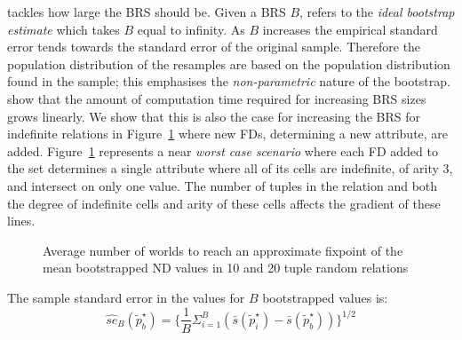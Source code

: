 \cite{et93} tackles how large the BRS should be. Given a BRS $B$, \cite{et93}
refers to the {\em ideal bootstrap estimate} which takes $B$ equal to
infinity. As $B$ increases the empirical standard error tends towards
the standard error of the original sample. Therefore the population
distribution of
the resamples are based on the population distribution found in the
sample; this emphasises the {\em non-parametric} nature of the bootstrap.
\cite{et93} show that the amount of computation time required for increasing
BRS sizes grows linearly. We show that this is also the case for 
increasing the BRS for indefinite relations in Figure~\ref{graph:linboot}
where new FDs, determining a new attribute, are added.
Figure~\ref{graph:linboot} represents a near {\em worst case scenario}
where each FD added to the 
set determines a single attribute where all of its cells are indefinite, of
arity 3, and intersect on only one value. The number of tuples in the
relation and both the degree of indefinite cells and arity of these
cells affects the gradient of these lines.


\begin{figure}
\centerline{}
\caption{\label{graph:linboot} {Average number of worlds to
reach an approximate fixpoint of the mean bootstrapped ND values in 10
and 20 tuple random relations}}
\end{figure}

\begin{definition}
\begin{rm}
The sample standard error in the values for $B$ bootstrapped
values is:
\begin{displaymath}
\hat{se}_B(\tilde{p}^\star_b) = \{ \frac{1}{B}\Sigma_{i = 1}^{B}(\bar{s}(\tilde{p}^\star_i) - \bar{s}(\tilde{p}^\star_b)) \}^{1/2}
\end{displaymath}
\end{rm}
\end{definition}

